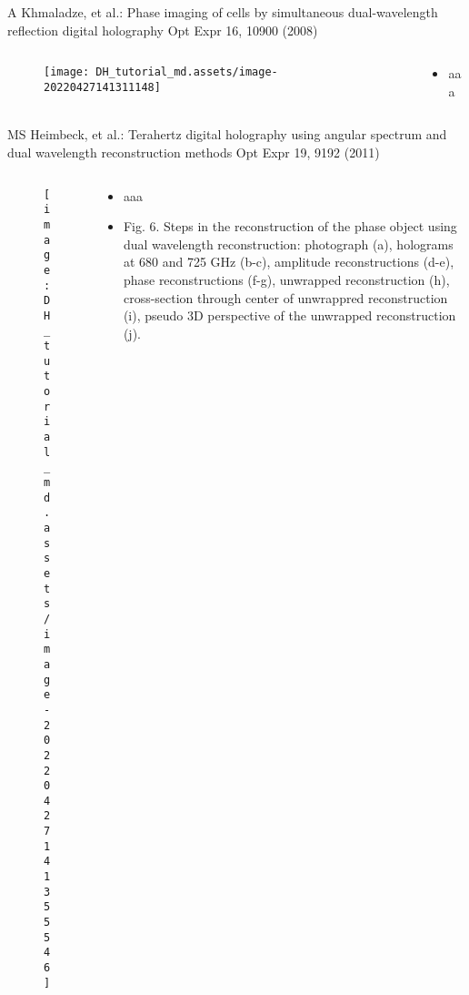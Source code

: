 \documentclass[t, aspectratio=169]{beamer}
\begin{document}
\begin{frame}{A Khmaladze, et al.: Phase imaging of cells by simultaneous dual-wavelength reflection digital holography}
	\vspace{-3 mm}
	\small Opt Expr 16, 10900 (2008)
	\begin{columns}
		\begin{column}{.6\textwidth}
			\begin{figure}
				\texttt{[image: DH\_tutorial\_md.assets/image-20220427141311148]}
			\end{figure}
		\end{column}
		\begin{column}{.4\textwidth}
			\begin{itemize}
				\item aaa
			\end{itemize}
		\end{column}
	\end{columns}
\end{frame}




\begin{frame}{MS Heimbeck, et al.: Terahertz digital holography using angular spectrum and dual wavelength reconstruction methods}
	\vspace{-3 mm}
	\small Opt Expr 19, 9192 (2011)
	\begin{columns}
		\begin{column}{.6\textwidth}
			\begin{figure}
				\texttt{[image: DH\_tutorial\_md.assets/image-20220427141355546]}
			\end{figure}
		\end{column}
		\begin{column}{.4\textwidth}
			\begin{itemize}
				\item aaa
				\item Fig.  6.  Steps  in  the  reconstruction  of  the  phase  object  using  dual  wavelength  reconstruction: photograph  (a),  holograms  at  680  and  725  GHz  (b-c),  amplitude  reconstructions  (d-e),  phase reconstructions   (f-g),   unwrapped   reconstruction   (h),   cross-section   through   center   of unwrappred reconstruction (i), pseudo 3D perspective of the unwrapped reconstruction (j).
			\end{itemize}
		\end{column}
	\end{columns}
\end{frame}
\end{document}
